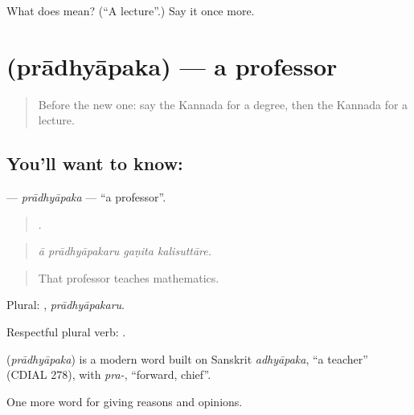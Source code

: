 \begin{tcolorbox}[breakable,colback=teal!4,colframe=teal!35!black,title={Before you move on}]
What does  mean? (\textquotedblleft{}A lecture\textquotedblright{}.) Say it once more.
\end{tcolorbox}
\section[\texorpdfstring{\kn{ಪ್ರಾಧ್ಯಾಪಕ} (prādhyāpaka)}{ಪ್ರಾಧ್ಯಾಪಕ (prādhyāpaka)}]{ (prādhyāpaka) — a professor}

\label{lesson:KA-C406-pradhyapaka}



\begin{quote}
Before the new one: say the Kannada for a degree, then the Kannada for a lecture.
\end{quote}

\subsection*{You'll want to know: }
\textbf{} — \emph{prādhyāpaka} — \textquotedblleft{}a professor\textquotedblright{}.

\begin{quote}
   .
\end{quote}

\begin{quote}
\emph{ā prādhyāpakaru gaṇita kalisuttāre.}
\end{quote}

\begin{quote}
That professor teaches mathematics.
\end{quote}

Plural: , \emph{prādhyāpakaru}.

Respectful plural verb:  .

\begin{cousinweb}
\textbf{} (\emph{prādhyāpaka}) is a modern word built on Sanskrit \emph{adhyāpaka}, \textquotedblleft{}a teacher\textquotedblright{} (CDIAL 278), with \emph{pra-}, \textquotedblleft{}forward, chief\textquotedblright{}.
\end{cousinweb}

\begin{grammarlens}[title={What you've built}]
One more word for giving reasons and opinions.
\end{grammarlens}

